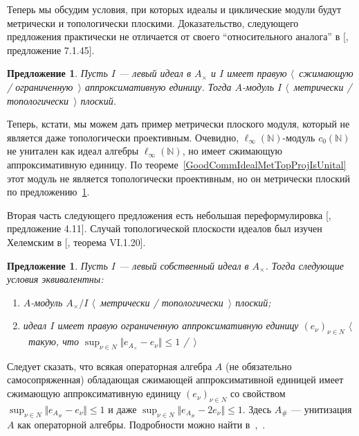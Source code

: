 \documentclass[12pt]{article}
\newtheorem{proposition}[theorem]{Предложение}
\begin{document}
Теперь	 мы обсудим условия, при которых идеалы и циклические модули будут
метрически и топологически плоскими. Доказательство, следующего предложения
практически не отличается от своего ``относительного аналога'' в
[\cite{HelBanLocConvAlg}, предложение 7.1.45].

\begin{proposition}\label{MetTopFlatIdealsInUnitalAlg} Пусть $I$ --- левый идеал
    в $A_\times $ и $I$ имеет правую $\langle$~сжимающую /
    ограниченную~$\rangle$ аппроксимативную единицу. Тогда $A$-модуль $I$
    $\langle$~метрически / топологически~$\rangle$ плоский.
\end{proposition}

Теперь, кстати, мы можем дать пример метрически плоского модуля, который не
является даже топологически проективным. Очевидно,
$\ell_\infty(\mathbb{N})$-модуль $c_0(\mathbb{N})$ не унитален как идеал алгебры
$\ell_\infty(\mathbb{N})$, но имеет сжимающую аппроксимативную единицу. По
теореме~\ref{GoodCommIdealMetTopProjIsUnital} этот модуль не является
топологически проективным, но он метрически плоский по
предложению~\ref{MetTopFlatIdealsInUnitalAlg}.

Вторая часть следующего предложения есть небольшая переформулировка
[\cite{WhiteInjmoduAlg}, предложение 4.11]. Случай топологической плоскости
идеалов был изучен Хелемским в [\cite{HelHomolBanTopAlg}, теорема VI.1.20].

\begin{proposition}\label{MetTopFlatCycModCharac} Пусть $I$ --- левый
    собственный идеал в $A_\times $. Тогда следующие условия эквивалентны:
    \begin{enumerate}[label = (\roman*)]
        \item $A$-модуль $A_\times /I$ $\langle$~метрически /
              топологически~$\rangle$ плоский;

        \item идеал $I$ имеет правую ограниченную аппроксимативную единицу
              ${(e_\nu)}_{\nu\in N}$ $\langle$~такую, что
              $\sup_{\nu\in N}\Vert e_{A_\times}-e_\nu\Vert\leq 1$ /~$\rangle$
    \end{enumerate}

\end{proposition}

Следует сказать, что всякая операторная алгебра $A$ (не обязательно
самосопряженная) обладающая сжимающей аппроксимативной единицей имеет сжимающую
аппроксимативную единицу ${(e_\nu)}_{\nu\in N}$ со свойством $\sup_{\nu\in
        N}\Vert e_{A_\#}-e_\nu\Vert\leq 1$ и даже $\sup_{\nu\in N}\Vert
    e_{A_\#}-2e_\nu\Vert\leq 1$. Здесь $A_\#$ --- унитизация $A$ как операторной
алгебры. Подробности можно найти
в~\cite{PosAndApproxIdinBanAlg},~\cite{BleContrAppIdInOpAlg}.
\end{document}
